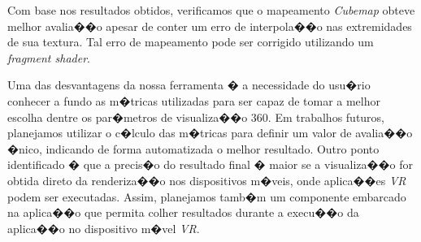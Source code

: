 \documentclass[12pt]{article}
\begin{document}

Com base nos resultados obtidos, verificamos que o mapeamento \textit{Cubemap} obteve melhor avalia��o apesar de conter um erro de interpola��o nas extremidades de sua textura. Tal erro de mapeamento pode ser corrigido utilizando um \textit{fragment shader}.

Uma das desvantagens da nossa ferramenta � a necessidade do usu�rio conhecer a fundo as m�tricas utilizadas para ser capaz de tomar a melhor escolha dentre os par�metros de visualiza��o 360. Em trabalhos futuros, planejamos utilizar o c�lculo das m�tricas para definir um valor de avalia��o �nico, indicando de forma automatizada o melhor resultado. Outro ponto identificado � que a precis�o do resultado final � maior se a visualiza��o for obtida direto da renderiza��o nos dispositivos m�veis, onde aplica��es \textit{VR} podem ser executadas. Assim, planejamos tamb�m um componente embarcado na aplica��o que permita colher resultados durante a execu��o da aplica��o no dispositivo m�vel \textit{VR}.




\end{document}
